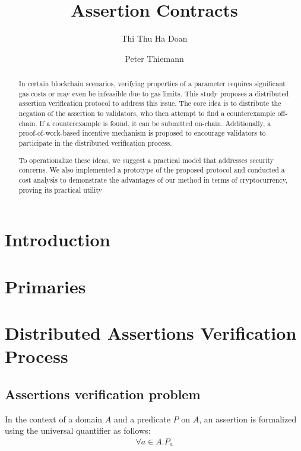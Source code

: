 \documentclass[runningheads]{llncs}
\begin{document}
%
\title{Assertion Contracts}
%
%
\author{Thi Thu Ha Doan\and Peter Thiemann}

%
%
%
\maketitle              %
%
\begin{abstract}
In certain blockchain scenarios, verifying properties of a parameter requires significant gas costs or may even be infeasible due to gas limits. This study proposes a distributed assertion verification protocol to address this issue. The core idea is to distribute the negation of the assertion to validators, who then attempt to find a counterexample off-chain. If a counterexample is found, it can be submitted on-chain. Additionally, a proof-of-work-based incentive mechanism is proposed to encourage validators to participate in the distributed verification process.

To operationalize these ideas, we suggest a practical model that addresses security concerns. We also implemented a prototype of the proposed protocol and conducted a cost analysis to demonstrate the advantages of our method in terms of cryptocurrency, proving its practical utility
 \keywords{}
\end{abstract}
%
%
%
\section{Introduction}
\label{sec:introduction}

\section{Primaries}
\label{sec:primaries}


\section{Distributed Assertions Verification Process}
\label{sec:approach}
\subsection{Assertions verification problem}
In the context of a domain $A$ and a predicate $P$ on $A$, an assertion is formalized using the universal quantifier as follows:
\begin{gather}
  \label{eq:1}
\forall a \in A. P_{a}
\end{gather}
\end{document}
